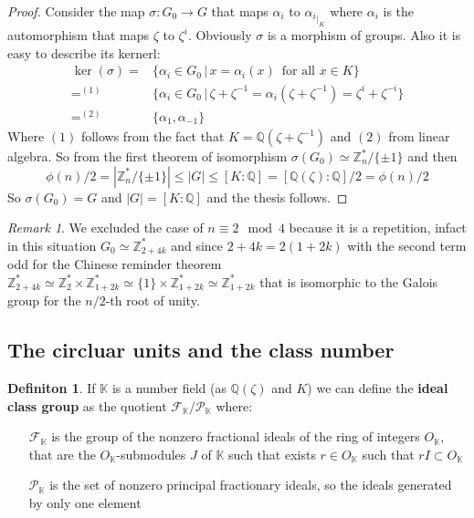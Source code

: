 \documentclass[]{article}
\theoremstyle{plain}
\theoremstyle{remark}
\newtheorem{rem}{Remark}
\theoremstyle{definition}
\newtheorem{deff}[teo]{Definiton}
\newcommand{\Z}{\mathbb{Z}}
\newcommand{\K}{\mathbb{K}}
\newcommand{\Q}{\mathbb{Q}}
\DeclareMathOperator*{\eqb }{=}
\begin{document}
	\begin{proof}
		Consider the map $ \sigma : G_0 \to G $ that maps $ \alpha_i $ to $ {\alpha_i }_{|_{K}} $ where $ \alpha_i $ is the automorphism that maps $ \zeta $ to $ \zeta ^i $. Obviously $\sigma$ is a morphism of groups.
		Also it is easy to describe its kernerl:
		\begin{align*}
			\ker (\sigma) =	& \{ \alpha_i \in G_0 \,|\,  x = \alpha_i(x)  \,\text{ for all } x \in K  \}\\
							 \eqb ^{(1)}	& \{ \alpha_i \in G_0 \,|\,  \zeta + \zeta^{-1} = \alpha_i (\zeta + \zeta^{-1}) = \zeta^i  + \zeta ^{-i}\} \\
							 \eqb^{(2)}& \{ \alpha_1 , \alpha_{-1}\}
		\end{align*}
		Where $ (1) $ follows from the fact that $ K = \Q (\zeta + \zeta ^{-1}) $ and $ (2) $ from linear algebra. %
		So from the first theorem of isomorphism $ \sigma(G_0) \simeq  \Z_{n}^*/ \{\pm 1\}  $ and then 
		\begin{equation*}
			\phi(n)/2 = | \Z_{n}^*/ \{\pm 1\}| \leq |G| \leq [K : \Q] = [\Q( \zeta) : \Q ]/ 2 = \phi(n)/2
		\end{equation*}
		So $  \sigma(G_0) = G $ and $ |G| = [K : \Q] $ and the thesis follows. 
	\end{proof}
	
	\begin{rem}
		We excluded the case of $ n \equiv 2 \mod 4 $ because it is a repetition, infact in this situation $ G_0 \simeq \Z_{2 + 4k}^* $ and since $ 2+ 4k = 2 (1+2k) $ with the second term odd for the Chinese reminder theorem $ \Z_{2 + 4k}^* \simeq \Z_2^* \times \Z_{1 + 2k}^* \simeq \{1\} \times \Z_{1 + 2k}^* \simeq \Z_{1 + 2k}^* $ that is isomorphic to the Galois group for the $ n/2 $-th root of unity.  
	\end{rem}



	\subsection{The circluar units and the class number}

	\begin{deff}
		If $ \K $ is a number field (as $ \Q (\zeta) $ and $ K $)  we can define the \textbf{ideal class group} as the quotient $ \mathcal{F}_\K / \mathcal{P}_\K $ where:
	\begin{itemize}
		\item[$ \mathcal{F}_\K $] is the group of the nonzero fractional ideals of the ring of integers  $ O_\K $, that are the $ O_\K  $-submodules $ J $ of $ \K $ such that exists $ r \in O_\K  $ such that $ r I \subset O_\K  $
		\item[$ \mathcal{P}_\K $] is the set of nonzero principal fractionary ideals, so the ideals generated by only one element
	\end{itemize}
	\end{deff}
\end{document}
